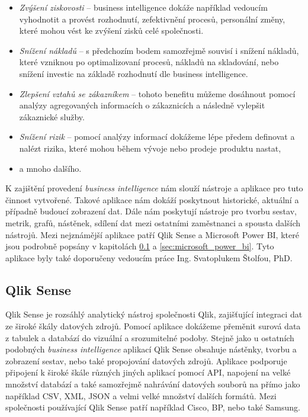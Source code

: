 \documentclass[czech,master,public,dept460,male,cpdeclaration,oneside]{diploma}
\begin{document}
\begin{itemize}
\item \textit{Zvýšení ziskovosti} -- business intelligence dokáže například vedoucím vyhodnotit a provést rozhodnutí, zefektivnění procesů, personální změny, které mohou vést ke zvýšení zisků celé společnosti.
\item \textit{Snížení nákladů} -- s předchozím bodem samozřejmě souvisí i snížení nákladů, které vzniknou po optimalizovaní procesů, nákladů na skladování, nebo snížení investic na základě rozhodnutí dle business intelligence.
\item \textit{Zlepšení vztahů se zákazníkem} -- tohoto benefitu můžeme dosáhnout pomocí analýzy agregovaných informacích o zákaznicích a následně vylepšit zákaznické služby.
\item \textit{Snížení rizik} -- pomocí analýzy informací dokážeme lépe předem definovat a nalézt rizika, které mohou během vývoje nebo prodeje produktu nastat,  
\item a mnoho dalšího.
\end{itemize}

K zajištění provedení \textit{business intelligence} nám slouží nástroje a aplikace pro tuto činnost vytvořené. Takové aplikace nám dokáží poskytnout historické, aktuální a případně budoucí zobrazení dat. Dále nám poskytují nástroje pro tvorbu sestav, metrik, grafů, nástěnek, sdílení dat mezi ostatními zaměstnanci a spousta dalších nástrojů. Mezi nejznámější aplikace patří Qlik Sense a Microsoft Power BI, které jsou podrobně popsány v kapitolách \ref{sec:qlik} a \ref{sec:microsoft_power_bi}. Tyto aplikace byly také doporučeny vedoucím práce Ing. Svatoplukem Štolfou, PhD. 

\subsection{Qlik Sense}
\label{sec:qlik}
Qlik Sense je rozsáhlý analytický nástroj společnosti Qlik, zajišťující integraci dat ze široké škály datových zdrojů. Pomocí aplikace dokážeme přeměnit surová data z tabulek a databází do vizuální a srozumitelné podoby. Stejně jako u ostatních podobných \textit{business intelligence} aplikací Qlik Sense obsahuje nástěnky, tvorbu a zobrazení sestav, nebo také propojování datových zdrojů. Aplikace podporuje připojení k široké škále různých jiných aplikací pomocí API, napojení na velké množství databází a také samozřejmě nahrávání datových souborů na přímo jako například CSV, XML, JSON a velmi velké množství dalších formátů. Mezi společnosti používající Qlik Sense patří například Cisco, BP, nebo také Samsung. \cite{ref:qlik_general}
\end{document}
